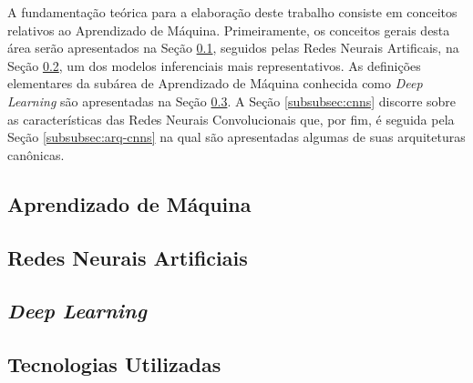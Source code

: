 
A fundamentação teórica para a elaboração deste trabalho consiste em conceitos relativos ao Aprendizado de Máquina. Primeiramente, os conceitos gerais desta área serão apresentados na Seção \ref{subsec:ml}, seguidos pelas Redes Neurais Artificais, na Seção \ref{subsec:rna}, um dos modelos inferenciais mais representativos.
As definições elementares da subárea de Aprendizado de Máquina conhecida como \emph{Deep Learning} são apresentadas na Seção \ref{subsec:dl}. A Seção \ref{subsubsec:cnns} discorre sobre as características das Redes Neurais Convolucionais que, por fim, é seguida pela Seção \ref{subsubsec:arq-cnns} na qual são apresentadas algumas de suas arquiteturas canônicas.


\subsection{Aprendizado de Máquina}
\label{subsec:ml}


\subsection{Redes Neurais Artificiais}
\label{subsec:rna}


\subsection{\emph{Deep Learning}}
\label{subsec:dl}


\subsection{Tecnologias Utilizadas}
\label{subsec:tecnologias}

